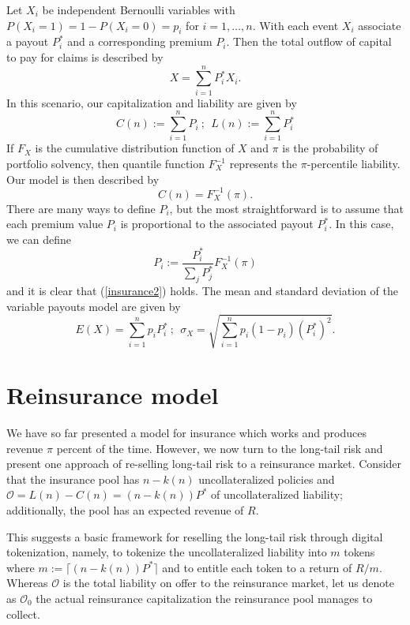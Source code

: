 \documentclass[12pt]{article}
\begin{document}
Let $X_i$ be independent Bernoulli variables with $P(X_i = 1) = 1 - P(X_i = 0) = p_i$ for $i=1,\ldots,n$. With each event $X_i$ associate a payout $P^*_i$ and a corresponding premium $P_i$. Then the total outflow of capital to pay for claims is described by
\begin{equation}
  X = \sum_{i=1}^n P_i^* X_i.
\end{equation} 
In this scenario, our capitalization and liability are given by
\begin{equation*}
    C(n) := \sum_{i=1}^nP_i\ ;\ \ L(n) := \sum_{i=1}^n P_i^* 
\end{equation*}
If $F_X$ is the cumulative distribution function of $X$ and $\pi$ is the probability of portfolio solvency, then quantile function $F_X^{-1}$ represents the $\pi$-percentile liability. Our model is then described by
\begin{equation}
  \label{insurance2}
    C(n) = F_X^{-1}(\pi).
\end{equation}
There are many ways to define $P_i$, but the most straightforward is to assume that each premium value $P_i$ is proportional to the associated payout $P_i^*$. In this case, we can define $$P_i := \frac{P_i^*}{\sum_j P_j^*} F_X^{-1}(\pi)$$ and it is clear that (\ref{insurance2}) holds. The mean and standard deviation of the variable payouts model are given by $$E(X) = \sum_{i=1}^np_iP_i^*\ ;\ \ \sigma_X = \sqrt{\sum_{i=1}^np_i(1-p_i)(P_i^*)^2}.$$


\iffalse
\section{Reinsurance model}

We have so far presented a model for insurance which works and produces revenue $\pi$ percent of the time. However, we now turn to the long-tail risk and present one approach of re-selling long-tail risk to a reinsurance market. Consider that the insurance pool has $n-k(n)$ uncollateralized policies and $\mathcal O = L(n)-C(n)=(n-k(n))P^*$ of uncollateralized liability; additionally, the pool has an expected revenue of $R$.

This suggests a basic framework for reselling the long-tail risk through digital tokenization, namely, to tokenize the uncollateralized liability into $m$ tokens where $m := \lceil(n-k(n))P^*\rceil$ and to entitle each token to a return of $R/m$. Whereas $\mathcal O$ is the total liability on offer to the reinsurance market, let us denote as $\mathcal O_0$ the actual reinsurance capitalization the reinsurance pool manages to collect.
\end{document}
